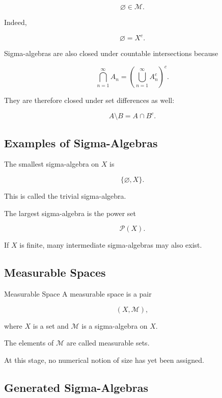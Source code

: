 \[
\boxed{
\varnothing\in\mathcal{M}.
}
\]

Indeed,

\[
\varnothing=X^c.
\]

Sigma-algebras are also closed under countable intersections because

\[
\boxed{
\bigcap_{n=1}^{\infty}A_n
=
\left(
\bigcup_{n=1}^{\infty}A_n^c
\right)^c.
}
\]

They are therefore closed under set differences as well:

\[
\boxed{
A\setminus B
=
A\cap B^c.
}
\]

\subsection{Examples of Sigma-Algebras}
\label{subsec:examples-sigma-algebras}

The smallest sigma-algebra on \(X\) is

\[
\boxed{
\{\varnothing,X\}.
}
\]

This is called the trivial sigma-algebra.

The largest sigma-algebra is the power set

\[
\boxed{
\mathcal{P}(X).
}
\]

If \(X\) is finite, many intermediate sigma-algebras may also exist.

\subsection{Measurable Spaces}
\label{subsec:measurable-spaces}

\begin{definitionbox}{Measurable Space}
A measurable space is a pair

\[
\boxed{
(X,\mathcal{M}),
}
\]

where \(X\) is a set and \(\mathcal{M}\) is a sigma-algebra on \(X\).
\end{definitionbox}

The elements of \(\mathcal{M}\) are called measurable sets.

At this stage, no numerical notion of size has yet been assigned.

\subsection{Generated Sigma-Algebras}
\label{subsec:generated-sigma-algebras}

